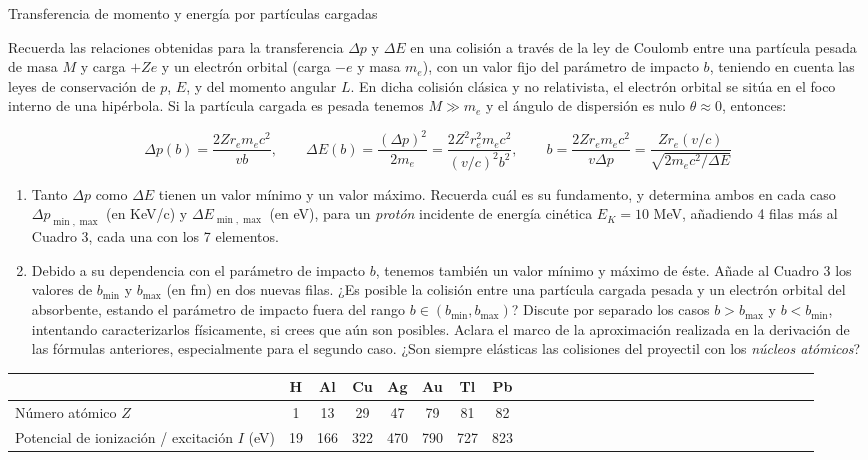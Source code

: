 \begin{Ejercicio}{Transferencia de momento y energía por partículas cargadas} \label{Ej:02.03}

Recuerda las relaciones obtenidas para la transferencia $\Delta p$ y $\Delta E$ en una colisión a través de la ley de Coulomb entre una partícula pesada de masa $M$ y carga $+Ze$ y un electrón orbital (carga $-e$ y masa $m_e$), con un valor fijo del parámetro de impacto $b$, teniendo en cuenta las leyes de conservación de $p$, $E$, y del momento angular $L$. En dicha colisión clásica y no relativista, el electrón orbital se sitúa en el foco interno de una hipérbola. Si la partícula cargada es pesada tenemos $M \gg m_e$ y el ángulo de dispersión es nulo $\theta \approx 0$, entonces:

\[
\Delta p(b) = \frac{2 Z r_e m_e c^2}{v b}, \qquad 
\Delta E(b) = \frac{(\Delta p)^2}{2 m_e} = \frac{2 Z^2 r_e^2 m_e c^2}{(v/c)^2 b^2}, \qquad
b = \frac{2 Z r_e m_e c^2}{v \Delta p} = \frac{Z r_e (v/c)}{\sqrt{2 m_e c^2 / \Delta E}}
\]

\begin{enumerate}[label=\alph*)]
\item Tanto $\Delta p$ como $\Delta E$ tienen un valor mínimo y un valor máximo. Recuerda cuál es su fundamento, y determina ambos en cada caso $\Delta p_{\min,\max}$ (en KeV/c) y $\Delta E_{\min,\max}$ (en eV), para un \emph{protón} incidente de energía cinética $E_K = 10$ MeV, añadiendo 4 filas más al Cuadro 3, cada una con los 7 elementos.

\item  Debido a su dependencia con el parámetro de impacto $b$, tenemos también un valor mínimo y máximo de éste. Añade al Cuadro 3 los valores de $b_{\min}$ y $b_{\max}$ (en fm) en dos nuevas filas. ¿Es posible la colisión entre una partícula cargada pesada y un electrón orbital del absorbente, estando el parámetro de impacto fuera del rango $b \in (b_{\min}, b_{\max})$? Discute por separado los casos $b > b_{\max}$ y $b < b_{\min}$, intentando caracterizarlos físicamente, si crees que aún son posibles. Aclara el marco de la aproximación realizada en la derivación de las fórmulas anteriores, especialmente para el segundo caso. ¿Son siempre elásticas las colisiones del proyectil con los \emph{núcleos atómicos}? \\[1em]
\end{enumerate}

\begin{center}
\begin{tabular}{lcccccccccccccccccccccccccccc}
\toprule & H & Al & Cu & Ag & Au & Tl & Pb \\
\midrule
Número atómico $Z$ & 1 & 13 & 29 & 47 & 79 & 81 & 82 \\
Potencial de ionización / excitación $I$ (eV) & 19 & 166 & 322 & 470 & 790 & 727 & 823 \\
\bottomrule
\end{tabular}
\end{center}
\end{Ejercicio}

